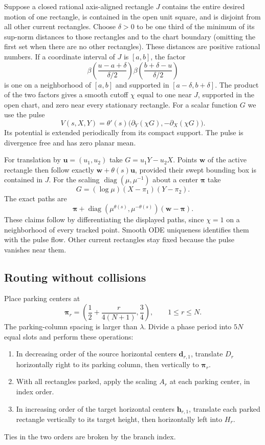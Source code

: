 \documentclass[11pt]{article}
\theoremstyle{remark}\newtheorem{remark}[theorem]{Remark}
\begin{document}
Suppose a closed rational axis-aligned rectangle $J$ contains the
entire desired motion of one rectangle, is contained in the open unit
square, and is disjoint from all other current rectangles.  Choose
$\delta>0$ to be one third of the minimum of its sup-norm distances
to those rectangles and to the chart boundary (omitting the first set
when there are no other rectangles).  These distances are
positive rational numbers.  If a coordinate interval of $J$ is $[a,b]$,
the factor
\[
 \beta\left(\frac{u-a+\delta}{\delta/2}\right)
 \beta\left(\frac{b+\delta-u}{\delta/2}\right)
\]
is one on a neighborhood of $[a,b]$ and supported in
$[a-\delta,b+\delta]$.  The product of the two factors gives a smooth
cutoff $\chi$ equal to one near $J$, supported in the open chart,
and zero near every stationary rectangle.  For a scalar function $G$
we use the pulse
\begin{equation}\label{eq:Hamiltonian-pulse}
 V(s,X,Y)=\theta'(s)
 \big(\partial_Y(\chi G),-\partial_X(\chi G)\big).
\end{equation}
Its potential is extended periodically from its compact support.  The
pulse is divergence free and has zero planar mean.

For translation by $\mathbf u=(u_1,u_2)$ take $G=u_1Y-u_2X$.
Points $\mathbf w$ of the active rectangle then follow exactly
$\mathbf w+\theta(s)\mathbf u$, provided their swept bounding box
is contained in $J$.  For the scaling
$\operatorname{diag}(\mu,\mu^{-1})$ about a center $\boldsymbol\pi$
take
\[
 G=(\log\mu)(X-\pi_1)(Y-\pi_2).
\]
The exact paths are
\[
 \boldsymbol\pi+
 \operatorname{diag}(\mu^{\theta(s)},\mu^{-\theta(s)})
 (\mathbf w-\boldsymbol\pi).
\]
These claims follow by differentiating the displayed paths, since
$\chi=1$ on a neighborhood of every tracked point.  Smooth ODE
uniqueness identifies them with the pulse flow.  Other current
rectangles stay fixed because the pulse vanishes near them.

\subsection{Routing without collisions}

Place parking centers at
\[
 \boldsymbol\pi_r=
 \left(\frac12+\frac{r}{4(N+1)},\frac34\right),
 \qquad 1\le r\le N.
\]
The parking-column spacing is larger than $\lambda$.  Divide a phase
period into $5N$ equal slots and perform these operations:
\begin{enumerate}
\item In decreasing order of the source horizontal centers
$\mathbf d_{r,1}$, translate $D_r$ horizontally right to its parking
column, then vertically to $\boldsymbol\pi_r$.
\item With all rectangles parked, apply the scaling $A_r$ at each
parking center, in index order.
\item In increasing order of the target horizontal centers
$\mathbf h_{r,1}$, translate each parked rectangle vertically to its
target height, then horizontally left into $H_r$.
\end{enumerate}
Ties in the two orders are broken by the branch index.
\end{document}
